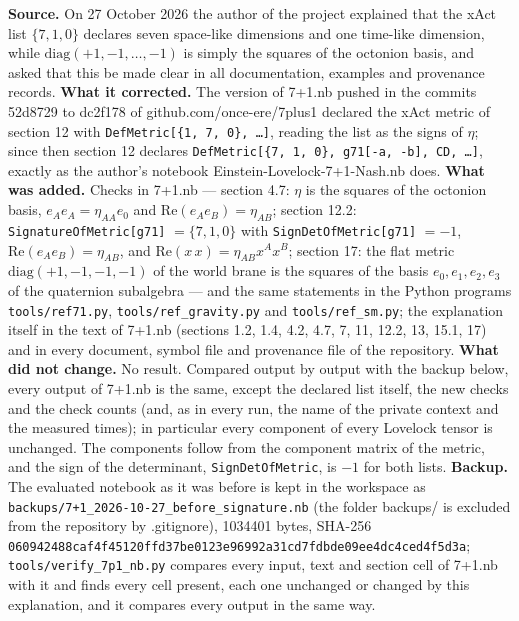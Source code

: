 \documentclass[10pt,a4paper]{article}
\begin{document}
\textbf{Source.} On 27 October 2026 the author of the project explained that the xAct list $\{7,1,0\}$ declares seven space-like dimensions and one time-like dimension, while $\mathrm{diag}(+1,-1,\dots,-1)$ is simply the squares of the octonion basis, and asked that this be made clear in all documentation, examples and provenance records. \textbf{What it corrected.} The version of 7+1.nb pushed in the commits 52d8729 to dc2f178 of github.com/once-ere/7plus1 declared the xAct metric of section 12 with \texttt{DefMetric[\{1, 7, 0\}, …]}, reading the list as the signs of $\eta$; since then section 12 declares \texttt{DefMetric[\{7, 1, 0\}, g71[-a, -b], CD, …]}, exactly as the author’s notebook Einstein-Lovelock-7+1-Nash.nb does. \textbf{What was added.} Checks in 7+1.nb — section 4.7: $\eta$ is the squares of the octonion basis, $e_Ae_A=\eta_{AA}e_0$ and $\mathrm{Re}(e_Ae_B)=\eta_{AB}$; section 12.2: \texttt{SignatureOfMetric[g71]} $=\{7,1,0\}$ with \texttt{SignDetOfMetric[g71]} $=-1$, $\mathrm{Re}(e_Ae_B)=\eta_{AB}$, and $\mathrm{Re}(x\,x)=\eta_{AB}x^Ax^B$; section 17: the flat metric $\mathrm{diag}(+1,-1,-1,-1)$ of the world brane is the squares of the basis $e_0,e_1,e_2,e_3$ of the quaternion subalgebra — and the same statements in the Python programs \texttt{tools/\allowbreak{}ref71.py}, \texttt{tools/\allowbreak{}ref\_\allowbreak{}gravity.py} and \texttt{tools/\allowbreak{}ref\_\allowbreak{}sm.py}; the explanation itself in the text of 7+1.nb (sections 1.2, 1.4, 4.2, 4.7, 7, 11, 12.2, 13, 15.1, 17) and in every document, symbol file and provenance file of the repository. \textbf{What did not change.} No result. Compared output by output with the backup below, every output of 7+1.nb is the same, except the declared list itself, the new checks and the check counts (and, as in every run, the name of the private context and the measured times); in particular every component of every Lovelock tensor is unchanged. The components follow from the component matrix of the metric, and the sign of the determinant, \texttt{SignDetOfMetric}, is $-1$ for both lists. \textbf{Backup.} The evaluated notebook as it was before is kept in the workspace as \texttt{backups/\allowbreak{}7+1\_\allowbreak{}2026-10-27\_\allowbreak{}before\_\allowbreak{}signature.nb} (the folder backups/ is excluded from the repository by .gitignore), 1034401 bytes, SHA-256 \texttt{06094248\allowbreak{}8caf4f45\allowbreak{}120ffd37\allowbreak{}be0123e9\allowbreak{}6992a31c\allowbreak{}d7fdbde0\allowbreak{}9ee4dc4c\allowbreak{}ed4f5d3a}; \texttt{tools/\allowbreak{}verify\_\allowbreak{}7p1\_\allowbreak{}nb.py} compares every input, text and section cell of 7+1.nb with it and finds every cell present, each one unchanged or changed by this explanation, and it compares every output in the same way.
\end{document}
